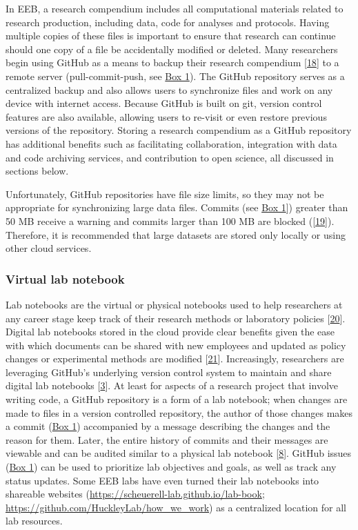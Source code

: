 In EEB, a research compendium includes all computational materials related to research production, including data, code for analyses and protocols.
Having multiple copies of these files is important to ensure that research can continue should one copy of a file be accidentally modified or deleted.
Many researchers begin using GitHub as a means to backup their research compendium {[}\protect\hyperlink{ref-MwwMapRG}{18}{]} to a remote server (pull-commit-push, see \protect\hyperlink{definitions}{Box 1}).
The GitHub repository serves as a centralized backup and also allows users to synchronize files and work on any device with internet access.
Because GitHub is built on git, version control features are also available, allowing users to re-visit or even restore previous versions of the repository.
Storing a research compendium as a GitHub repository has additional benefits such as facilitating collaboration, integration with data and code archiving services, and contribution to open science, all discussed in sections below.

Unfortunately, GitHub repositories have file size limits, so they may not be appropriate for synchronizing large data files.
Commits (see \protect\hyperlink{definitions}{Box 1}{]}) greater than 50 MB receive a warning and commits larger than 100 MB are blocked ({[}\protect\hyperlink{ref-1Co6ZZjF1}{19}{]}).
Therefore, it is recommended that large datasets are stored only locally or using other cloud services.

\hypertarget{virtual-lab-notebook}{%
\subsubsection{Virtual lab notebook}\label{virtual-lab-notebook}}

Lab notebooks are the virtual or physical notebooks used to help researchers at any career stage keep track of their research methods or laboratory policies {[}\protect\hyperlink{ref-wwHxTOtm}{20}{]}.
Digital lab notebooks stored in the cloud provide clear benefits given the ease with which documents can be shared with new employees and updated as policy changes or experimental methods are modified {[}\protect\hyperlink{ref-10V7x4H4l}{21}{]}.
Increasingly, researchers are leveraging GitHub's underlying version control system to maintain and share digital lab notebooks {[}\protect\hyperlink{ref-10ghgV3S8}{3}{]}.
At least for aspects of a research project that involve writing code, a GitHub repository is a form of a lab notebook; when changes are made to files in a version controlled repository, the author of those changes makes a commit (\protect\hyperlink{definitions}{Box 1}) accompanied by a message describing the changes and the reason for them. Later, the entire history of commits and their messages are viewable and can be audited similar to a physical lab notebook {[}\protect\hyperlink{ref-4ny1onB0}{8}{]}.
GitHub issues (\protect\hyperlink{definitions}{Box 1}) can be used to prioritize lab objectives and goals, as well as track any status updates.
Some EEB labs have even turned their lab notebooks into shareable websites (\url{https://scheuerell-lab.github.io/lab-book}; \url{https://github.com/HuckleyLab/how_we_work}) as a centralized location for all lab resources.

